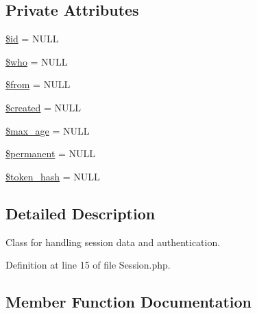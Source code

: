 \subsection*{Private Attributes}
\begin{DoxyCompactItemize}
\item 
\hyperlink{classlibresignage_1_1common_1_1php_1_1auth_1_1Session_a037d45f9ec743cb4ba9ba9e9a0d5d749}{\$id} = N\+U\+LL
\item 
\hyperlink{classlibresignage_1_1common_1_1php_1_1auth_1_1Session_aa098172f3ff15b60edc7f6608b821b5f}{\$who} = N\+U\+LL
\item 
\hyperlink{classlibresignage_1_1common_1_1php_1_1auth_1_1Session_a36ef5b5d45535fe68422117c0efa19a2}{\$from} = N\+U\+LL
\item 
\hyperlink{classlibresignage_1_1common_1_1php_1_1auth_1_1Session_a5f37d7decbbe6b3b6af0479b3b588e84}{\$created} = N\+U\+LL
\item 
\hyperlink{classlibresignage_1_1common_1_1php_1_1auth_1_1Session_a978e75428a0792dd270d6cabb9c62a16}{\$max\+\_\+age} = N\+U\+LL
\item 
\hyperlink{classlibresignage_1_1common_1_1php_1_1auth_1_1Session_aa9ae1ccf3a21735e53a0b3685477f18c}{\$permanent} = N\+U\+LL
\item 
\hyperlink{classlibresignage_1_1common_1_1php_1_1auth_1_1Session_a5721a80b8395cac578aef46189820d22}{\$token\+\_\+hash} = N\+U\+LL
\end{DoxyCompactItemize}


\subsection{Detailed Description}
Class for handling session data and authentication. 

Definition at line 15 of file Session.\+php.



\subsection{Member Function Documentation}
\mbox{\label{classlibresignage_1_1common_1_1php_1_1auth_1_1Session_afaa73175f57bc82eaa11cdc7523b7a0e}} 
